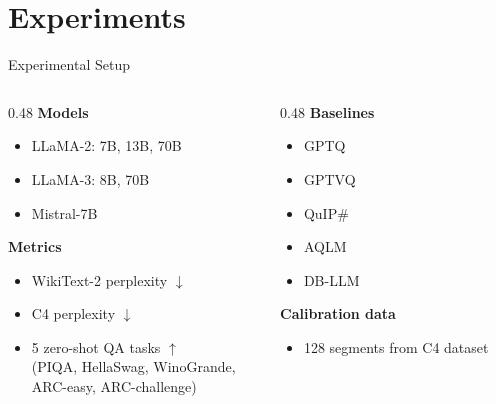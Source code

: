 \section{Experiments}

\begin{frame}{Experimental Setup}
  \begin{columns}[T]
    \begin{column}{0.48\textwidth}
      \textbf{Models}
      \begin{itemize}
        \item LLaMA-2: 7B, 13B, 70B
        \item LLaMA-3: 8B, 70B
        \item Mistral-7B
      \end{itemize}
      \vspace{0.5em}
      \textbf{Metrics}
      \begin{itemize}
        \item WikiText-2 perplexity $\downarrow$
        \item C4 perplexity $\downarrow$
        \item 5 zero-shot QA tasks $\uparrow$\\
          \small (PIQA, HellaSwag, WinoGrande,\\ARC-easy, ARC-challenge)
      \end{itemize}
    \end{column}
    \begin{column}{0.48\textwidth}
      \textbf{Baselines}
      \begin{itemize}
        \item GPTQ
        \item GPTVQ
        \item QuIP\#
        \item AQLM
        \item DB-LLM
      \end{itemize}
      \vspace{0.5em}
      \textbf{Calibration data}
      \begin{itemize}
        \item 128 segments from C4 dataset
      \end{itemize}
    \end{column}
  \end{columns}
\end{frame}

